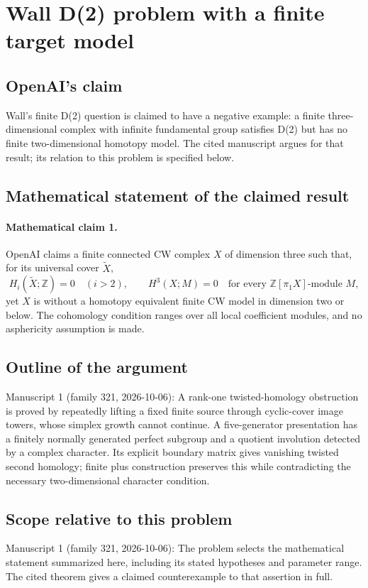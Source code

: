 \documentclass[11pt]{article}
\begin{document}
\section*{Wall D(2) problem with a finite target model}

\subsection{OpenAI's claim}
Wall's finite D(2) question is claimed to have a negative example: a finite three-dimensional complex with infinite fundamental group satisfies D(2) but has no finite two-dimensional homotopy model. The cited manuscript argues for that result; its relation to this problem is specified below.

\subsection{Mathematical statement of the claimed result}
\paragraph{Mathematical claim 1.} OpenAI claims a finite connected CW complex $X$ of dimension three such that, for its universal cover $\widetilde X$,
\[
H_i(\widetilde X;\mathbb Z)=0\quad(i>2),\qquad
H^3(X;M)=0\quad\text{for every }\mathbb Z[\pi_1X]\text{-module }M,
\]
yet $X$ is without a homotopy equivalent finite CW model in dimension two or below. The cohomology condition ranges over all local coefficient modules, and no asphericity assumption is made.

\subsection{Outline of the argument}
Manuscript 1 (family 321, 2026-10-06): A rank-one twisted-homology obstruction is proved by repeatedly lifting a fixed finite source through cyclic-cover image towers, whose simplex growth cannot continue. A five-generator presentation has a finitely normally generated perfect subgroup and a quotient involution detected by a complex character. Its explicit boundary matrix gives vanishing twisted second homology; finite plus construction preserves this while contradicting the necessary two-dimensional character condition.

\subsection{Scope relative to this problem}
Manuscript 1 (family 321, 2026-10-06): The problem selects the mathematical statement summarized here, including its stated hypotheses and parameter range. The cited theorem gives a claimed counterexample to that assertion in full.
\end{document}
